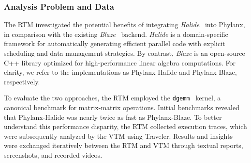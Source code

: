 \begin{refsection}
\subsubsection{Analysis Problem and Data}
\label{subsubsec:analysis_problem}

The RTM investigated the potential benefits of integrating {\em Halide}~\cite{ragan2017halide} into Phylanx, in comparison with the existing {\em Blaze}~\cite{Blaze} backend. {\em Halide} is a domain-specific framework for automatically generating efficient parallel code with explicit scheduling and data management strategies. By contrast, {\em Blaze} is an open-source C++ library optimized for high-performance linear algebra computations. For clarity, we refer to the implementations as Phylanx-Halide and Phylanx-Blaze, respectively. 

To evaluate the two approaches, the RTM employed the \texttt{dgemm}~\cite{dgemm} kernel, a canonical benchmark for matrix-matrix operations. Initial benchmarks revealed that Phylanx-Halide was nearly twice as fast as Phylanx-Blaze. To better understand this performance disparity, the RTM collected execution traces, which were subsequently analyzed by the VTM using Traveler. Results and insights were exchanged iteratively between the RTM and VTM through textual reports, screenshots, and recorded videos.




\end{refsection}
